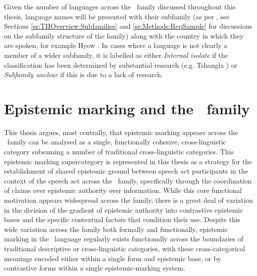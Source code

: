 Given the number of languages across the \lfam\ family discussed throughout this thesis, language names will be presented with their subfamily (as per , see Sections \ref{ss:THOverview:Subfamilies} and \ref{ss:Methods:RepSample} for discussions on the subfamily structure of the family) along with the country in which they are spoken, for example Hyow \cite[Kukish: Myanmar,][]{Zakaria2018}. In cases where a language is not clearly a member of a wider subfamily, it is labelled as either \textit{Internal isolate} if the classification has been determined by substantial research (e.g. Tshangla \cite[Internal isolate: Bhutan,][]{Grollmann2020}) or \textit{Subfamily unclear} if this is due to a lack of research.


\section{Epistemic marking and the \lfam\ family}\label{s:Intro:Thesis}
This thesis argues, most centrally, that epistemic marking appears across the \lfam\ family can be analysed as a single, functionally cohesive, cross-linguistic category subsuming a number of traditional cross-linguistic categories. This epistemic marking supercategory is represented in this thesis as a strategy for the establishment of shared epistemic ground between speech act participants in the context of the speech act across the \lfam\ family, specifically through the coordination of claims over epistemic authority over information. While this core functional motivation appears widespread across the family, there is a great deal of variation in the division of the gradient of epistemic authority into contrastive epistemic bases and the specific contextual factors that condition their use. Despite this wide variation across the family both formally and functionally, epistemic marking in the \lfam\ language regularly exists functionally across the boundaries of traditional descriptive or cross-linguistic categories, with these cross-categorical meanings encoded either within a single form and epistemic base, or by contrastive forms within a single epistemic-marking system.

